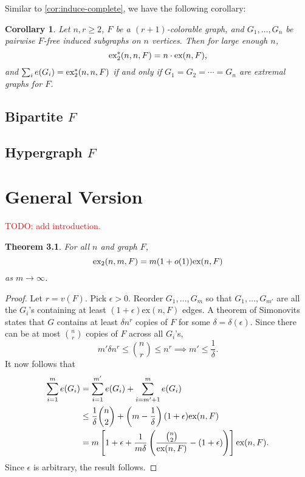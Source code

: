 \documentclass[12pt]{report}
\newtheorem{theorem}{Theorem}[chapter]
\newtheorem{corollary}[theorem]{Corollary}
\newcommand*{\ex}{\textnormal{ex}}
\newcommand*{\dex}{\textnormal{ex}_2}
\begin{document}
Similar to \cref{cor:induce-complete}, we have the following corollary:

\begin{corollary}
  Let $n , r\geq 2$, $F$ be a $(r + 1)$-colorable graph, and $G_1, \ldots, G_n$ be pairwise $F$-free induced subgraphs on $n$ vertices. Then for large enough $n$,
  \[
    \dex^*(n, n, F) = n \cdot \ex(n, F),
  \]
  and $\sum_i e(G_i) = \dex^*(n, n, F)$ if and only if $G_1 = G_2 = \cdots = G_n$ are extremal graphs for $F$.
\end{corollary}

\section{Bipartite $F$}

\section{Hypergraph $F$}

\chapter{General Version}

\textcolor{red}{TODO: add introduction.}

\begin{theorem}
  For all $n$ and graph $F$,
  \[
    \dex(n, m, F) = m(1 + o(1))\ex(n, F)
  \]
  as $m \to \infty$.
\end{theorem}

\begin{proof}
  Let $r = v(F)$. Pick $\epsilon > 0$. Reorder $G_1, \ldots, G_m$ so that $G_1, \ldots, G_{m'}$ are all the $G_i$'s containing at least $(1 + \epsilon)\text{ex}(n, F)$ edges. A theorem of Simonovits states that $G$ contains at least $\delta n^r$ copies of $F$ for some $\delta = \delta(\epsilon)$. Since there can be at most $\binom{n}{r}$ copies of $F$ across all $G_i$'s, 
  \[
    m'\delta n^{r} \leq \binom{n}{r} \leq n^r \implies m' \leq \frac{1}{\delta}.
  \]
  It now follows that
  \begin{align*}
    \sum_{i = 1}^m e(G_i) 
    &= \sum_{i = 1}^{m'} e(G_i) + \sum_{i = m' + 1}^m e(G_i) \\
    &\leq \frac{1}{\delta}\binom{n}{2} + \left(m - \frac{1}{\delta}\right)(1 + \epsilon)\text{ex}(n, F) \\
    &= m\left[1 + \epsilon + \frac{1}{m\delta}\left(\frac{\binom{n}{2}}{\ex(n, F)} - (1 + \epsilon)\right)\right]\ex(n, F).
  \end{align*}
  Since $\epsilon$ is arbitrary, the result follows.
\end{proof}
\end{document}

